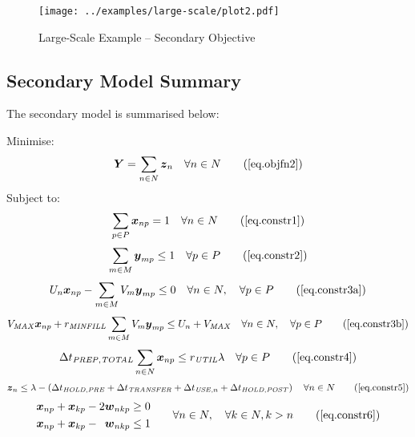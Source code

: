 \begin{figure}
    \centering
    \texttt{[image: ../examples/large-scale/plot2.pdf]}
    \caption{Large-Scale Example -- Secondary Objective}
    \label{fig.secondary}
\end{figure}

\subsection{Secondary Model Summary}\label{SS.model2summary}

The secondary model is summarised below:

Minimise:
\begin{equation}
    \boldsymbol{Y} = \sum_{n \in N} \boldsymbol{z}_{n} \quad \forall n \in N
    \tag{\ref{eq.objfn2}}
\end{equation}
Subject to:
\begin{equation}
    \sum_{p \in P} \boldsymbol{x}_{np} = 1 \quad \forall n \in N
    \tag{\ref{eq.constr1}}
\end{equation}
\begin{equation}
    \sum_{m \in M} \boldsymbol{y}_{mp} \le 1 \quad \forall p \in P
    \tag{\ref{eq.constr2}}
\end{equation}
\begin{equation}
    U_{n} \boldsymbol{x}_{np} - \sum_{m \in M} V_{m} \boldsymbol{y}_{mp} \le 0
    \quad \forall n \in N, \quad \forall p \in P
    \tag{\ref{eq.constr3a}}
\end{equation}
\begin{equation}
    V_{\mathit{MAX}} \boldsymbol{x}_{np} + r_{\mathit{MINFILL}} \sum_{m \in M}
    V_{m} \boldsymbol{y}_{mp} \le U_{n} + V_{\mathit{MAX}} \quad \forall n \in
    N, \quad \forall p \in P
    \tag{\ref{eq.constr3b}}
\end{equation}
\begin{equation}
    \Delta t_{\mathit{PREP,TOTAL}} \sum_{n \in N} \boldsymbol{x}_{np} \le 
    r_{\mathit{UTIL}} \lambda \quad \forall p \in P
    \tag{\ref{eq.constr4}}
\end{equation}
\begin{equation}
    \boldsymbol{z}_{n} \le \lambda - \left( \Delta t_{\mathit{HOLD,PRE}} +
    \Delta t_{\mathit{TRANSFER}} + \Delta t_{\mathit{USE},n} + \Delta
    t_{\mathit{HOLD,POST}} \right) \quad \forall n \in N
    \tag{\ref{eq.constr5}}
\end{equation}
\begin{equation}
    \begin{split}
        \begin{alignedat}{3}
            \boldsymbol{x}_{np} & {}+{} & \boldsymbol{x}_{kp} & {}-{} & 2
            \boldsymbol{w}_{nkp} & \ge 0\\
            \boldsymbol{x}_{np} & {}+{} & \boldsymbol{x}_{kp} & {}-{} &
            \boldsymbol{w}_{nkp} & \le 1\\
        \end{alignedat}
    \end{split}
    \quad\quad
    \begin{split}
        \forall n \in N, \quad \forall k \in N, k > n
    \end{split}
    \tag{\ref{eq.constr6}}
\end{equation}
